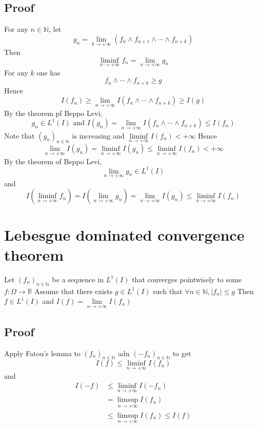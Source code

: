 \documentclass{book}
\newcommand{\abs}[1]{\left\lvert #1 \right\rvert}
\begin{document}
\subsection*{Proof}
For any $n\in\mathbb{N}$, let $$g_n=\lim\limits_{k\rightarrow+\infty}(f_n\wedge f_{n+1}\wedge\cdots\wedge f_{n+k})$$
Then 
$$\liminf\limits_{n\rightarrow+\infty}f_n=\lim\limits_{n\rightarrow+\infty}g_n$$
For any $k$ one has $$f_n\wedge\cdots\wedge f_{n+k}\geq g$$
Hence 
$$I(f_n)\geq\lim\limits_{n\rightarrow+\infty}I(f_n\wedge\cdots\wedge f_{n+k})\geq I(g)$$
By the theorem pf Beppo Levi, $$g_n\in L^1(I)\text{ and } I(g_n)=\lim\limits_{n\rightarrow+\infty}I(f_n\wedge\cdots\wedge f_{n+k})\leq I(f_n)$$
Note that $(g_n)_{n\in \mathbb{N}}$ is increasing and $\liminf\limits_{n\rightarrow+\infty}I(f_n)<+\infty$ Hence
$$\lim\limits_{n\rightarrow+\infty}I(g_n)=\liminf\limits_{n\rightarrow+\infty}I(g_n)\leq\liminf\limits_{n\rightarrow+\infty}I(f_n)<+\infty$$
By the theorem of Beppo Levi, 
$$\lim\limits_{n\rightarrow+\infty}g_n\in L^1(I)$$
and 
$$I(\liminf\limits_{n\rightarrow+\infty}f_n)=I(\lim\limits_{n\rightarrow+\infty}g_n)=\lim\limits_{n\rightarrow+\infty}I(g_n)\leq\liminf\limits_{n\rightarrow+\infty} I(f_n)$$
\section{Lebesgue dominated convergence theorem}
Let $(f_n)_{n\in \mathbb{N}}$ be a sequence in $L^1(I)$ that converges pointwisely to some $f:\Omega\rightarrow\mathbb{R}$ Assume that there exists $g\in L^1(I)$ such that $\forall n\in \mathbb{N},\abs{f_n}\leq g$
Then $f\in L^1(I)$ and $I(f)=\lim\limits_{n\rightarrow+\infty}I(f_n)$
\subsection*{Proof}
Apply Fatou's lemma to $(f_n)_{n\in \mathbb{N}}$ adn $(-f_n)_{n\in\mathbb{N}}$ to get 
$$I(f)\leq\liminf\limits_{n\rightarrow+\infty}I(f_n)$$
and 
$$
\begin{aligned}
    I(-f) &\leq\liminf\limits_{n\rightarrow+\infty}I(-f_n)\\
    &=\limsup\limits_{n\rightarrow+\infty} I(f_n)\\
    &\leq \limsup\limits_{n\rightarrow+\infty}I(f_n)\leq I(f)
\end{aligned}$$
\end{document}
